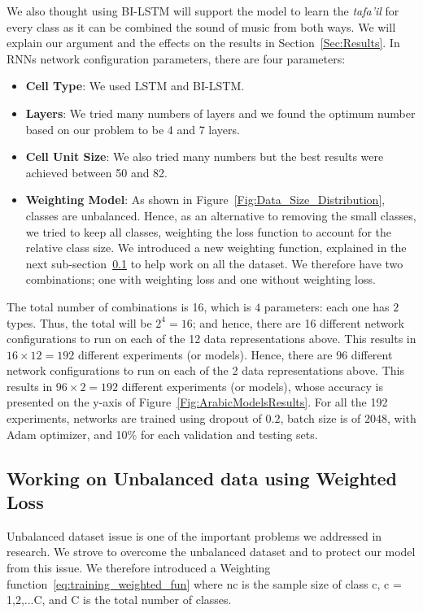 We also thought using BI-LSTM will support the model to learn the \textit{tafa'il} for every class as it can be combined the sound of music from both ways. We will explain our argument and the effects on the results in Section~\ref{Sec:Results}.
In RNNs network configuration parameters, there are four parameters:
\begin{itemize}
\item \textbf{Cell Type}: We used LSTM and BI-LSTM.
\item \textbf{Layers}: We tried many numbers of layers and we found the optimum number based on our problem to be 4 and 7 layers.
\item \textbf{Cell Unit Size}: We also tried many numbers but the best results were achieved between 50 and 82.
\item \textbf{Weighting Model}: As shown in Figure~\ref{Fig:Data_Size_Distribution}, classes are unbalanced. Hence, as an alternative to removing the small classes, we tried to keep all classes, weighting the loss function to account for the relative class size. We introduced a new weighting function, explained in the next sub-section~\ref{Sec:W_Loss} to help work on all the dataset. We therefore have two combinations; one with weighting loss and one without weighting loss.
 
 \end{itemize}

The total number of combinations is 16, which is $4$ parameters: each one has $2$ types. Thus, the total will be $2^4=16$; and hence, there are 16 different network configurations to run on each of the 12 data representations above. This results in $16 \times 12 = 192$ different experiments (or models). Hence, there are 96 different network configurations to run on each of the 2 data representations above. This results in $96 \times 2 = 192$ different experiments (or models), whose accuracy is presented on the y-axis of Figure~\ref{Fig:ArabicModelsResults}. For all the 192 experiments, networks are trained using dropout of $0.2$, batch size is of $2048$, with Adam optimizer, and 10\% for each validation and testing sets.

\subsection{Working on Unbalanced data using Weighted Loss}\label{Sec:W_Loss}

Unbalanced dataset issue is one of the important problems we addressed in research. We strove to overcome the unbalanced dataset and to protect our model from this issue. We therefore introduced a Weighting function~\ref{eq:training_weighted_fun} where nc is the sample size of class c, c = 1,2,...C, and C is the total number of classes.%

